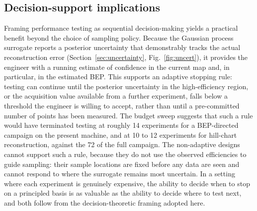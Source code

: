 \documentclass[preprint,12pt]{elsarticle}
\begin{document}
\subsection{Decision-support implications}\label{sec:decision}
Framing performance testing as sequential decision-making yields a practical benefit
beyond the choice of sampling policy. Because the Gaussian process surrogate reports a
posterior uncertainty that demonstrably tracks the actual reconstruction error
(Section~\ref{sec:uncertainty}, Fig.~\ref{fig:uncert}), it provides the engineer with
a running estimate of confidence in the current map and, in particular, in the
estimated BEP. This supports an adaptive stopping rule: testing can continue until the
posterior uncertainty in the high-efficiency region, or the acquisition value
available from a further experiment, falls below a threshold the engineer is willing to
accept, rather than until a pre-committed number of points has been measured. The
budget sweep suggests that such a rule would have terminated testing at roughly 14
experiments for a BEP-directed campaign on the present machine, and at 10 to 12
experiments for hill-chart reconstruction, against the 72 of the full campaign. The
non-adaptive designs cannot support such a rule, because they do not use the observed
efficiencies to guide sampling: their sample locations are fixed before any data are
seen and cannot respond to where the surrogate remains most uncertain. In a setting
where each experiment is genuinely expensive, the ability to decide when to stop on a
principled basis is as valuable as the ability to decide where to test next, and both
follow from the decision-theoretic framing adopted here.
\end{document}
